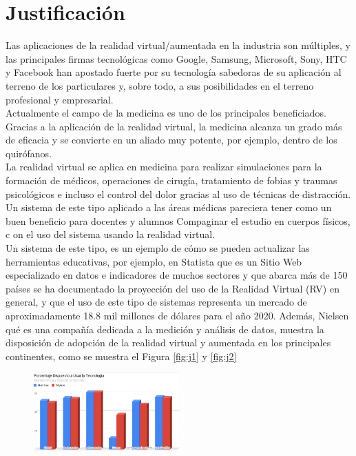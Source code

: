 \section{Justificación}
Las aplicaciones de la realidad virtual/aumentada en la industria son múltiples, y las principales firmas tecnológicas como Google, Samsung, Microsoft, 
Sony, HTC y Facebook han apostado fuerte por su tecnología sabedoras de su aplicación al terreno de los particulares y, sobre todo, a sus posibilidades 
en el terreno profesional y empresarial.\\
Actualmente el campo de la medicina es uno de los principales beneficiados. Gracias a la aplicación de la realidad virtual, la medicina alcanza un grado más de eficacia 
y se convierte en un aliado muy potente, por ejemplo, dentro de los quirófanos.\\
La realidad virtual se aplica en medicina para realizar simulaciones para la formación de médicos, operaciones de cirugía, tratamiento de fobias y traumas 
psicológicos e incluso el control del dolor gracias al uso de técnicas de distracción.\\
Un sistema de este tipo aplicado a las áreas médicas pareciera tener como un buen beneficio para docentes y alumnos Compaginar el estudio en cuerpos físicos, c
on el uso del sistema usando la realidad virtual\cite{norton1994integrating}.\\
Un sistema de este tipo, es un ejemplo de cómo se pueden actualizar las herramientas educativas, por ejemplo,  en Statista\cite{web1} que es un Sitio Web especializado 
en datos e indicadores de muchos sectores y que abarca más de 150 países se ha documentado la proyección del uso de la Realidad Virtual (RV) en general, y que el 
uso de este tipo de sistemas representa un mercado de aproximadamente 18.8 mil millones de dólares para el año 2020. Además, Nielsen\cite{web2} qué es una compañía dedicada 
a la medición y análisis de datos,  muestra la disposición de adopción de la realidad virtual y aumentada en los principales continentes, como se muestra el Figura \ref{fig:j1} y \ref{fig:j2}
\begin{figure}[H]
	\begin{center}
 		\includegraphics[width = 0.5\textwidth]{v3/images/chart2.png}
	\end{center} 
\end{figure}
